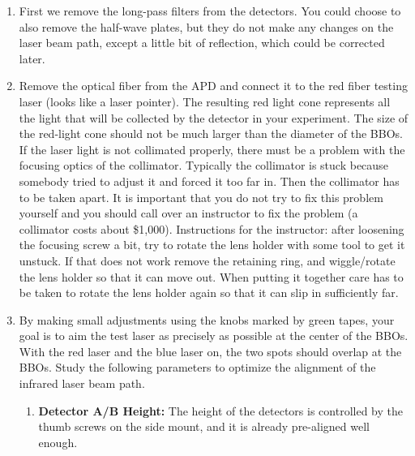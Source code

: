 \documentclass{../lab}
\begin{document}
\begin{enumerate}
    \item First we remove the long-pass filters from the detectors. You could choose to also remove the half-wave plates, but they do not make any changes on the laser beam path,  except a little bit of reflection, which could be corrected later.

    \item Remove the optical fiber from the APD and connect it to the red fiber testing laser (looks like a laser pointer). The resulting red light cone represents all the light that will be collected by the detector in your experiment. The size of the red-light cone should not be much larger than the diameter of the BBOs. If the laser light is not collimated properly, there must be a problem with the focusing optics of the collimator. Typically the collimator is stuck because somebody tried to adjust it and forced it too far in.  Then the collimator has to be taken apart. 
    It is important that you do not try to fix this problem yourself and you should call over an instructor to fix the problem (a collimator costs about \$1,000). Instructions for the instructor: after loosening the focusing screw a bit, try to rotate the lens holder with some tool to get it unstuck. If that does not work remove the retaining ring, and wiggle/rotate the lens holder so that it can move out.  When putting it together care has to be taken to rotate the lens holder again so that it can slip in sufficiently far. 

    \item By making small adjustments using the knobs marked by green tapes, your goal is to aim the test laser as precisely as possible at the center of the BBOs. With the red laser and the blue laser on, the two spots should overlap at the BBOs. Study the following parameters to optimize the alignment of the infrared laser beam path.
    \begin{enumerate}
        
    
    \item \textbf{Detector A/B Height:} 
    The height of the detectors is controlled by the thumb screws on the side mount, and it is already pre-aligned well enough. 
    

\end{enumerate}
\end{enumerate}
\end{document}
